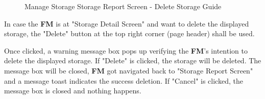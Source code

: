 \begin{figure}[H]
	\centering
  
    \vspace{10pt}
    
  
    \vspace{10pt}
    

    \caption{Manage Storage Storage Report Screen - Delete Storage Guide}
	\label{fig:MSreportDeleteGuide}
\end{figure}


\bigskip
In case the \textbf{FM} is at "Storage Detail Screen" and want to delete the displayed storage, the "Delete" button at the top right corner (page header) shall be used. 

Once clicked, a warning message box pops up verifying the \textbf{FM}'s intention to delete the displayed storage. If "Delete" is clicked, the storage will be deleted. The message box will be closed, \textbf{FM} got navigated back to "Storage Report Screen" and a message toast indicates the success deletion. If "Cancel" is clicked, the message box is closed and nothing happens.


